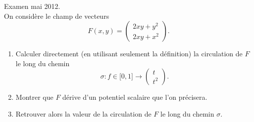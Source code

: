 
\begin{exercice}\label{exoOutilsMath-0143} Examen mai 2012.\\

On considère le champ de vecteurs
\begin{equation}
    F(x,y)=\begin{pmatrix}
        2xy+y^2    \\ 
        2xy+x^2    
    \end{pmatrix}.
\end{equation}
\begin{enumerate}
    \item
        Calculer directement (en utilisant seulement la définition) la circulation de \( F\) le long du chemin
        \begin{equation}
            \sigma\colon f\in\mathopen[ 0 , 1 \mathclose]\to \begin{pmatrix}
                t    \\ 
                t^2    
            \end{pmatrix}.
        \end{equation}
    \item
        Montrer que \( F\) dérive d'un potentiel scalaire que l'on précisera.
    \item
        Retrouver alors la valeur de la circulation de \( F\) le long du chemin \( \sigma\).
\end{enumerate}

\end{exercice}
